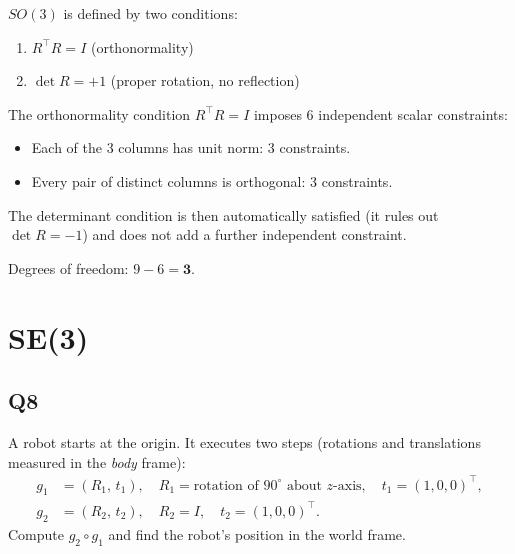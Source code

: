 \documentclass[12pt]{article}
\begin{document}
\begin{answerbox}
$SO(3)$ is defined by two conditions:
\begin{enumerate}[noitemsep]
  \item $R^\top R = I$ (orthonormality)
  \item $\det R = +1$ (proper rotation, no reflection)
\end{enumerate}
The orthonormality condition $R^\top R=I$ imposes 6 independent scalar
constraints:
\begin{itemize}[noitemsep]
  \item Each of the 3 columns has unit norm: 3 constraints.
  \item Every pair of distinct columns is orthogonal: 3 constraints.
\end{itemize}
The determinant condition is then automatically satisfied (it rules out
$\det R=-1$) and does not add a further independent constraint.

Degrees of freedom: $9 - 6 = \mathbf{3}$.
\end{answerbox}

\section*{SE(3)}

\subsection*{Q8}
A robot starts at the origin.  It executes two steps (rotations and translations
measured in the \emph{body} frame):
\begin{align*}
  g_1 &= (R_1,\,t_1),\quad
        R_1 = \text{rotation of }90^\circ\text{ about }z\text{-axis},\quad
        t_1 = (1,0,0)^\top,\\
  g_2 &= (R_2,\,t_2),\quad R_2 = I,\quad t_2 = (1,0,0)^\top.
\end{align*}
Compute $g_2\circ g_1$ and find the robot's position in the world frame.
\end{document}
